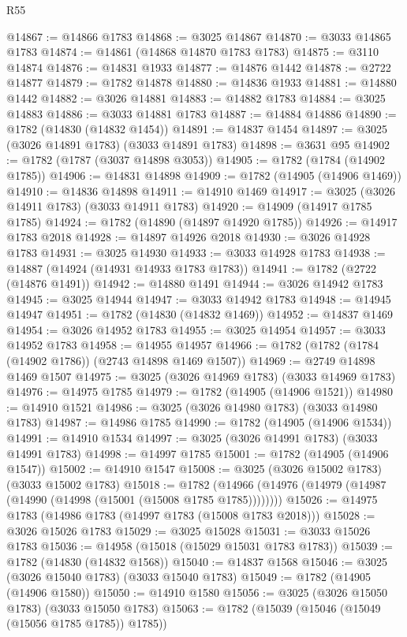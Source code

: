 \begin{lexlean}{R55}
\begin{coremodule}
@14867 := @14866 @1783
@14868 := @3025 @14867
@14870 := @3033 @14865 @1783
@14874 := @14861 (@14868 @14870 @1783 @1783)
@14875 := @3110 @14874
@14876 := @14831 @1933
@14877 := @14876 @1442
@14878 := @2722 @14877
@14879 := @1782 @14878
@14880 := @14836 @1933
@14881 := @14880 @1442
@14882 := @3026 @14881
@14883 := @14882 @1783
@14884 := @3025 @14883
@14886 := @3033 @14881 @1783
@14887 := @14884 @14886
@14890 := @1782 (@14830 (@14832 @1454))
@14891 := @14837 @1454
@14897 := @3025 (@3026 @14891 @1783) (@3033 @14891 @1783)
@14898 := @3631 @95
@14902 := @1782 (@1787 (@3037 @14898 @3053))
@14905 := @1782 (@1784 (@14902 @1785))
@14906 := @14831 @14898
@14909 := @1782 (@14905 (@14906 @1469))
@14910 := @14836 @14898
@14911 := @14910 @1469
@14917 := @3025 (@3026 @14911 @1783) (@3033 @14911 @1783)
@14920 := @14909 (@14917 @1785 @1785)
@14924 := @1782 (@14890 (@14897 @14920 @1785))
@14926 := @14917 @1783 @2018
@14928 := @14897 @14926 @2018
@14930 := @3026 @14928 @1783
@14931 := @3025 @14930
@14933 := @3033 @14928 @1783
@14938 := @14887 (@14924 (@14931 @14933 @1783 @1783))
@14941 := @1782 (@2722 (@14876 @1491))
@14942 := @14880 @1491
@14944 := @3026 @14942 @1783
@14945 := @3025 @14944
@14947 := @3033 @14942 @1783
@14948 := @14945 @14947
@14951 := @1782 (@14830 (@14832 @1469))
@14952 := @14837 @1469
@14954 := @3026 @14952 @1783
@14955 := @3025 @14954
@14957 := @3033 @14952 @1783
@14958 := @14955 @14957
@14966 := @1782 (@1782 (@1784 (@14902 @1786)) (@2743 @14898 @1469 @1507))
@14969 := @2749 @14898 @1469 @1507
@14975 := @3025 (@3026 @14969 @1783) (@3033 @14969 @1783)
@14976 := @14975 @1785
@14979 := @1782 (@14905 (@14906 @1521))
@14980 := @14910 @1521
@14986 := @3025 (@3026 @14980 @1783) (@3033 @14980 @1783)
@14987 := @14986 @1785
@14990 := @1782 (@14905 (@14906 @1534))
@14991 := @14910 @1534
@14997 := @3025 (@3026 @14991 @1783) (@3033 @14991 @1783)
@14998 := @14997 @1785
@15001 := @1782 (@14905 (@14906 @1547))
@15002 := @14910 @1547
@15008 := @3025 (@3026 @15002 @1783) (@3033 @15002 @1783)
@15018 := @1782 (@14966 (@14976 (@14979 (@14987 (@14990 (@14998 (@15001 (@15008 @1785 @1785))))))))
@15026 := @14975 @1783 (@14986 @1783 (@14997 @1783 (@15008 @1783 @2018)))
@15028 := @3026 @15026 @1783
@15029 := @3025 @15028
@15031 := @3033 @15026 @1783
@15036 := @14958 (@15018 (@15029 @15031 @1783 @1783))
@15039 := @1782 (@14830 (@14832 @1568))
@15040 := @14837 @1568
@15046 := @3025 (@3026 @15040 @1783) (@3033 @15040 @1783)
@15049 := @1782 (@14905 (@14906 @1580))
@15050 := @14910 @1580
@15056 := @3025 (@3026 @15050 @1783) (@3033 @15050 @1783)
@15063 := @1782 (@15039 (@15046 (@15049 (@15056 @1785 @1785)) @1785))

\end{coremodule}
\end{lexlean}
